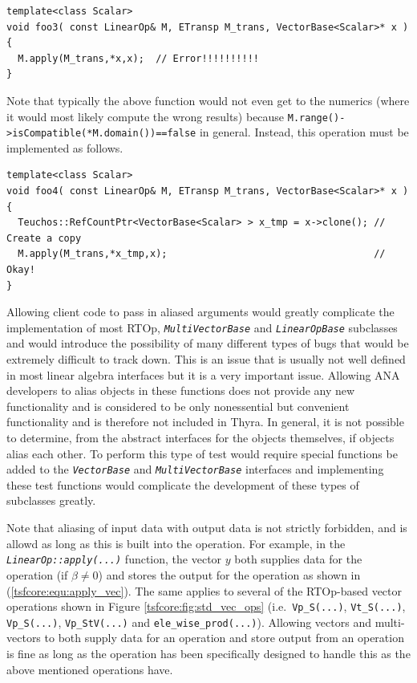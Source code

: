 \documentclass[pdf,ps2pdf,11pt]{SANDreport}
\begin{document}
{\scriptsize\begin{verbatim}
template<class Scalar>
void foo3( const LinearOp& M, ETransp M_trans, VectorBase<Scalar>* x )
{
  M.apply(M_trans,*x,x);  // Error!!!!!!!!!!
}
\end{verbatim}}

{}\noindent{}Note that typically the above function would not even get
to the numerics (where it would most likely compute the wrong results)
because {}\texttt{M.range()->isCompatible(*M.domain())==false} in
general.  Instead, this operation must be implemented as follows.

{\scriptsize\begin{verbatim}
template<class Scalar>
void foo4( const LinearOp& M, ETransp M_trans, VectorBase<Scalar>* x )
{
  Teuchos::RefCountPtr<VectorBase<Scalar> > x_tmp = x->clone(); // Create a copy
  M.apply(M_trans,*x_tmp,x);                                    // Okay!
}
\end{verbatim}}

{}\noindent{}Allowing client code to pass in aliased arguments would
greatly complicate the implementation of most RTOp,
{}\texttt{\textit{Multi\-Vector\-Base}} and {}\texttt{\textit{Linear\-Op\-Base}}
subclasses and would introduce the possibility of many different types
of bugs that would be extremely difficult to track down.  This is an
issue that is usually not well defined in most linear algebra
interfaces but it is a very important issue.  Allowing ANA developers
to alias objects in these functions does not provide any new
functionality and is considered to be only nonessential but convenient
functionality and is therefore not included in Thyra.  In general,
it is not possible to determine, from the abstract interfaces for the
objects themselves, if objects alias each other.  To perform this type
of test would require special functions be added to the
{}\texttt{\textit{Vector\-Base}} and {}\texttt{\textit{Multi\-Vector\-Base}}
interfaces and implementing these test functions would complicate the
development of these types of subclasses greatly.

Note that aliasing of input data with output data is not strictly
forbidden, and is allowd as long as this is built into the operation.
For example, in the {}\texttt{\textit{LinearOp\-::apply(\-...)}}
function, the vector $y$ both supplies data for the operation (if $\beta
\ne 0$) and stores the output for the operation as shown in
(\ref{tsfcore:equ:apply_vec}).  The same applies to several of the
RTOp-based vector operations shown in Figure
{}\ref{tsfcore:fig:std_vec_ops} (i.e.~\texttt{Vp\_S(...)},
{}\texttt{Vt\_S(...)}, {}\texttt{Vp\_S(...)}, {}\texttt{Vp\_StV(...)}
and {}\texttt{ele\_wise\_prod(...)}).  Allowing vectors and
multi-vectors to both supply data for an operation and store output
from an operation is fine as long as the operation has been
specifically designed to handle this as the above mentioned operations
have.
\end{document}
